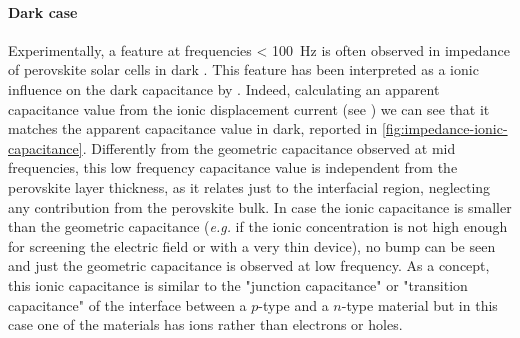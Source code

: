 	\paragraph{Dark case}\label{impedance_lowf_dark}
	Experimentally, a feature at frequencies \SI{< 100}{\Hz} is often observed in impedance of perovskite solar cells in dark \cite{Pockett2015,Juarez-Perez2014,Kim2015c,Guerrero2016,Zarazua2016}.
	This feature has been interpreted as a ionic influence on the dark capacitance by .
	Indeed, calculating an apparent capacitance value from the ionic displacement current (see ) we can see that it matches the apparent capacitance value in dark, reported in \cref{fig:impedance-ionic-capacitance}.
	Differently from the geometric capacitance observed at mid frequencies, this low frequency capacitance value is independent from the perovskite layer thickness, as it relates just to the interfacial region, neglecting any contribution from the perovskite bulk.
	In case the ionic capacitance is smaller than the geometric capacitance (\textsl{e.g.} if the ionic concentration is not high enough for screening the electric field or with a very thin device), no bump can be seen and just the geometric capacitance is observed at low frequency.
	As a concept, this ionic capacitance is similar to the "junction capacitance" or "transition capacitance" of the interface between a $p$-type and a $n$-type material but in this case one of the materials has ions rather than electrons or holes.




